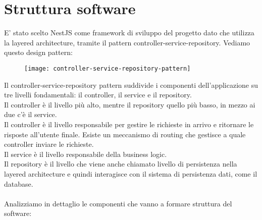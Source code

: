 \section{Struttura software}
E' stato scelto NestJS come framework di sviluppo del progetto dato che utilizza la layered architecture,
tramite il pattern controller-service-repository. Vediamo questo design pattern:
\begin{figure}[!h]
    \centering
    \texttt{[image: controller-service-repository-pattern]}
\end{figure}
\leavevmode\newline
Il controller-service-repository pattern suddivide i componenti dell'applicazione su tre livelli fondamentali:
il controller, il service e il repository.
\\
Il controller è il livello più alto, mentre il repository quello più basso, in mezzo ai due c'è il service.
\\
Il controller è il livello responsabile per gestire le richieste in arrivo e ritornare le risposte all'utente finale.
Esiste un meccanismo di routing che gestisce a quale controller inviare le richieste.
\\
Il service è il livello responsabile della business logic.
\\
Il repository è il livello che viene anche chiamato livello di persistenza nella layered architecture e quindi interagisce
con il sistema di persistenza dati, come il database.
\\\\
Analizziamo in dettaglio le componenti che vanno a formare struttura del software:


